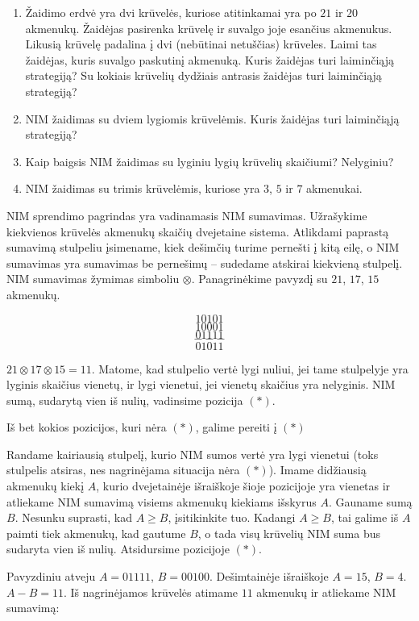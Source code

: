 \begin{enumerate}
  \item Žaidimo erdvė yra dvi krūvelės, kuriose atitinkamai yra po $21$ ir
    $20$ akmenukų. Žaidėjas pasirenka krūvelę ir suvalgo joje esančius akmenukus.
    Likusią krūvelę padalina į dvi (nebūtinai netuščias)
    krūveles. Laimi tas žaidėjas, kuris suvalgo paskutinį akmenuką. Kuris
    žaidėjas turi laiminčiąją strategiją? Su kokiais krūvelių dydžiais
    antrasis žaidėjas turi laiminčiąją strategiją? 
  \item NIM žaidimas su dviem lygiomis krūvelėmis. Kuris žaidėjas turi
    laiminčiąją strategiją?
  \item Kaip baigsis NIM žaidimas su lyginiu lygių krūvelių skaičiumi?
    Nelyginiu? 
  \item NIM žaidimas su trimis krūvelėmis, kuriose yra $3$, $5$ ir $7$
    akmenukai.
\end{enumerate} 

NIM sprendimo pagrindas yra vadinamasis NIM sumavimas. Užrašykime
kiekvienos krūvelės akmenukų skaičių dvejetaine sistema. Atlikdami paprastą
sumavimą stulpeliu įsimename, kiek dešimčių turime pernešti į kitą
eilę, o NIM sumavimas yra sumavimas be pernešimų – sudedame atskirai
kiekvieną stulpelį. NIM sumavimas žymimas simboliu $\otimes$.
Panagrinėkime pavyzdį su  $21$, $17$, $15$ akmenukų. 

$$10101$$$$10001$$$$01111$$$$---$$$$01011$$

$21 \otimes 17 \otimes 15=11$. Matome, kad stulpelio vertė lygi nuliui, jei
tame stulpelyje yra lyginis skaičius vienetų, ir lygi vienetui, jei vienetų
skaičius yra nelyginis. NIM sumą, sudarytą vien iš nulių, vadinsime pozicija
$(*)$. 

\begin{teig}
  Iš bet kokios pozicijos, kuri nėra $(*)$, galime pereiti į  $(*)$
\end{teig}

Randame kairiausią stulpelį, kurio NIM sumos vertė yra lygi vienetui (toks
stulpelis atsiras, nes nagrinėjama situacija nėra $(*)$). Imame didžiausią
akmenukų kiekį $A$, kurio dvejetainėje išraiškoje šioje pozicijoje yra
vienetas ir atliekame NIM sumavimą visiems akmenukų kiekiams išskyrus $A$.
Gauname sumą $B$.  Nesunku suprasti, kad $A\geq B$, įsitikinkite tuo. Kadangi
$A\geq B$, tai galime iš $A$ paimti tiek akmenukų, kad gautume $B$, o tada visų
krūvelių NIM suma bus sudaryta vien iš nulių. Atsidursime pozicijoje $(*)$.

Pavyzdiniu atveju $A = 01111$, $B = 00100$. Dešimtainėje išraiškoje $A =
15$, $B = 4$. $A - B = 11$. Iš nagrinėjamos krūvelės atimame $11$ akmenukų ir
atliekame NIM sumavimą: 

